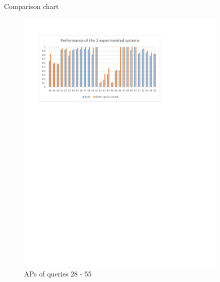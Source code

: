 \begin{frame}{Comparison chart}
  \begin{figure}{}
        \centering
        \includegraphics[width=4.0in]{ap2.pdf}
        \caption{APs of queries 28 - 55}
    \end{figure}
\end{frame}
